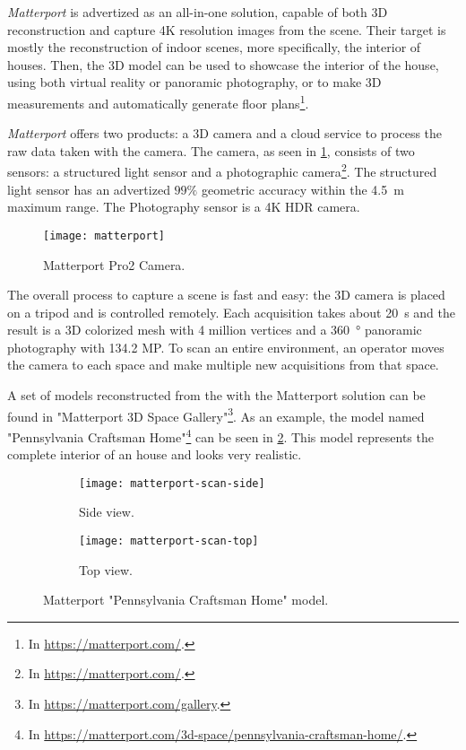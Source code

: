 \emph{Matterport} is advertized as an all-in-one solution, capable of both 3D reconstruction and capture 4K resolution images from the scene. Their target is mostly the reconstruction of indoor scenes, more specifically, the interior of houses. Then, the 3D model can be used to showcase the interior of the house, using both virtual reality or panoramic photography, or to make 3D measurements and automatically generate floor plans\footnote{In \url{https://matterport.com/}.}.

\emph{Matterport} offers two products: a 3D camera and a cloud service to process the raw data taken with the camera. The camera, as seen in \cref{fig:matterport-camera}, consists of two sensors: a structured light sensor and a photographic camera\footnote{In \url{https://matterport.com/}.}. The structured light sensor has an advertized $99\%$ geometric accuracy within the \SI{4.5}{\meter} maximum range. The Photography sensor is a 4K HDR camera.

\begin{figure}[h]
    
    \centering
    \texttt{[image: matterport]}

    \caption{Matterport Pro2 Camera.}
    \label{fig:matterport-camera}

\end{figure}

The overall process to capture a scene is fast and easy: the 3D camera is placed on a tripod and is controlled remotely. Each acquisition takes about \SI{20}{\second} and the result is a 3D colorized mesh with 4 million vertices and a \SI{360}{\degree} panoramic photography with 134.2 MP. To scan an entire environment, an operator moves the camera to each space and make multiple new acquisitions from that space.

A set of models reconstructed from the with the Matterport solution can be found in "Matterport 3D Space Gallery"\footnote{In \url{https://matterport.com/gallery}.}. As an example, the model named "Pennsylvania Craftsman Home"\footnote{In \url{https://matterport.com/3d-space/pennsylvania-craftsman-home/}.} can be seen in \cref{fig:matterport-model}. This model represents the complete interior of an house and looks very realistic.

\begin{figure}[h]
    
    \centering
    \begin{subfigure}{\textwidth}
        \centering
        \texttt{[image: matterport-scan-side]}
        \caption{Side view.}
    \end{subfigure}

    \begin{subfigure}{\textwidth}
        \centering
        \texttt{[image: matterport-scan-top]}
        \caption{Top view.}
    \end{subfigure}

    \caption{Matterport "Pennsylvania Craftsman Home" model.}
    \label{fig:matterport-model}
\end{figure}

